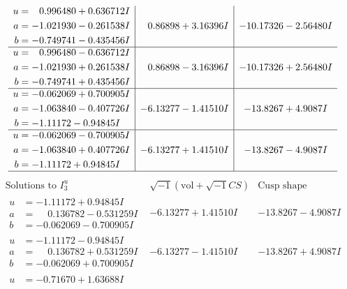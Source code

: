 \documentclass[1p]{elsarticle_modified}
\theoremstyle{definition}
\newcommand{\I}{\sqrt{-1}}
\begin{document}
$$\begin{array}{c|c|c}
\begin{aligned}
u &= \phantom{-}0.996480 + 0.636712 I \\
a &= -1.021930 - 0.261538 I \\
b &= -0.749741 - 0.435456 I\end{aligned}
 & \phantom{-}0.86898 + 3.16396 I & -10.17326 - 2.56480 I \\ \hline\begin{aligned}
u &= \phantom{-}0.996480 - 0.636712 I \\
a &= -1.021930 + 0.261538 I \\
b &= -0.749741 + 0.435456 I\end{aligned}
 & \phantom{-}0.86898 - 3.16396 I & -10.17326 + 2.56480 I \\ \hline\begin{aligned}
u &= -0.062069 + 0.700905 I \\
a &= -1.063840 - 0.407726 I \\
b &= -1.11172 - 0.94845 I\end{aligned}
 & -6.13277 - 1.41510 I & -13.8267 + 4.9087 I \\ \hline\begin{aligned}
u &= -0.062069 - 0.700905 I \\
a &= -1.063840 + 0.407726 I \\
b &= -1.11172 + 0.94845 I\end{aligned}
 & -6.13277 + 1.41510 I & -13.8267 - 4.9087 I\\
 \hline 
 \end{array}$$\newpage$$\begin{array}{c|c|c}  
\text{Solutions to }I^u_{3}& \I (\text{vol} + \sqrt{-1}CS) & \text{Cusp shape}\\
 \hline 
\begin{aligned}
u &= -1.11172 + 0.94845 I \\
a &= \phantom{-}0.136782 - 0.531259 I \\
b &= -0.062069 - 0.700905 I\end{aligned}
 & -6.13277 + 1.41510 I & -13.8267 - 4.9087 I \\ \hline\begin{aligned}
u &= -1.11172 - 0.94845 I \\
a &= \phantom{-}0.136782 + 0.531259 I \\
b &= -0.062069 + 0.700905 I\end{aligned}
 & -6.13277 - 1.41510 I & -13.8267 + 4.9087 I \\ \hline\begin{aligned}
u &= -0.71670 + 1.63688 I \\

\end{aligned}
\end{array}$$
\end{document}
